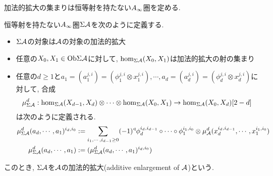 \documentclass[aspectratio=169, dvipdfmx, 8pt, notheorems, uplatex]{beamer}
\begin{document}
\begin{frame}
  加法的拡大の集まりは恒等射を持たない$A_\infty$圏を定める.

  \begin{definition}
    恒等射を持たない$A_\infty$圏$\Sigma\mathcal{A}$を次のように定義する. 
    \begin{itemize}
      \item $\Sigma\mathcal{A}$の対象は$\mathcal{A}$の対象の加法的拡大
      \item 任意の$X_0,X_1 \in \mathrm{Ob}\Sigma\mathcal{A}$に対して, $\hom_{\Sigma\mathcal{A}}(X_0,X_1)$は加法的拡大の射の集まり
      \item 任意の$d \geq 1$と$a_1 = (a_1^{j,i}) = (\phi_1^{j,i} \otimes x_1^{j,i}), \cdots, a_d = (a_d^{j,i}) = (\phi_d^{j,i} \otimes x_d^{j,i})$に対して, 合成
      \begin{align*}
        \mu^d_{\Sigma\mathcal{A}} : \hom_{\Sigma\mathcal{A}}(X_{d-1},X_d) \otimes \cdots \otimes \hom_{\Sigma\mathcal{A}}(X_0,X_1) \to \hom_{\Sigma\mathcal{A}}(X_0,X_d)[2-d]
      \end{align*}
      は次のように定義される. 
      \begin{align*}
        \mu^d_{\Sigma\mathcal{A}}(a_d,\cdots,a_1)^{i_d,i_0} 
        &:= \sum_{i_1,\cdots,i_{d-1} \geq 0} (-1)^\triangleleft 
        \phi_d^{i_d,i_{d-1}} \circ  \cdots \circ \phi_1^{i_1,i_0} \otimes \mu^d_{\mathcal{A}}(x_d^{i_d,i_{d-1}}, \cdots, x_1^{i_1,i_0}) \\
        \mu^d_{\Sigma\mathcal{A}}(a_d,\cdots,a_1) 
        &:= (\mu^d_{\Sigma\mathcal{A}}(a_d,\cdots,a_1)^{i_d,i_0})
      \end{align*}
    \end{itemize}
    このとき, $\Sigma\mathcal{A}$を$\mathcal{A}$の加法的拡大(additive enlargement of $\mathcal{A}$)という. 
  \end{definition}  
\end{frame}
\end{document}
